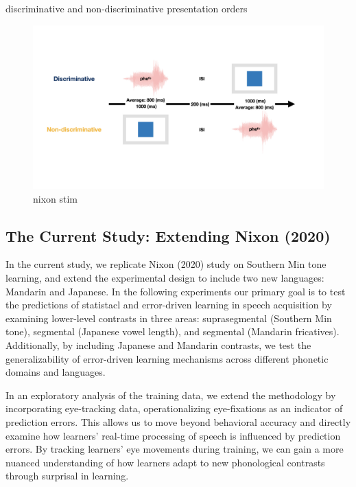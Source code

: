 discriminative and non-discriminative presentation orders

\begin{figure}[H]
  \centering
  \includegraphics[width=1\linewidth]{visualizations/visualizations/visualizations.005.jpeg}
  \caption{nixon stim}
  \label{fig:nixon_stim}
\end{figure}



\subsection{The Current Study: Extending Nixon (2020)}

In the current study, we replicate Nixon (2020) study on Southern Min tone learning, and extend the experimental design to include two new languages: Mandarin and Japanese. In the following experiments our primary goal is to test the predictions of statistacl and error-driven learning in speech acquisition by examining lower-level contrasts in three areas: suprasegmental (Southern Min tone), segmental (Japanese vowel length), and segmental (Mandarin fricatives).  Additionally, by including Japanese and Mandarin contrasts, we test the generalizability of error-driven learning mechanisms across different phonetic domains and languages.

In an exploratory analysis of the training data, we extend the methodology by incorporating eye-tracking data, operationalizing eye-fixations as an indicator of prediction errors. This allows us to move beyond behavioral accuracy and directly examine how learners’ real-time processing of speech is influenced by prediction errors. By tracking learners’ eye movements during training, we can gain a more nuanced understanding of how learners adapt to new phonological contrasts through surprisal in learning.

